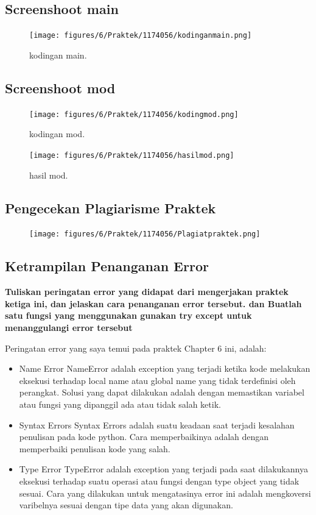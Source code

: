 \subsection{Screenshoot main}
\begin{figure}[H]
	\texttt{[image: figures/6/Praktek/1174056/kodinganmain.png]}
	\caption{kodingan main.}
	\centering
\end{figure}

\subsection{Screenshoot mod}
\begin{figure}[H]
	\texttt{[image: figures/6/Praktek/1174056/kodingmod.png]}
	\caption{kodingan mod.}
	\centering
\end{figure}

\begin{figure}[H]
	\texttt{[image: figures/6/Praktek/1174056/hasilmod.png]}
	\caption{hasil mod.}
	\centering
\end{figure}

\subsection{Pengecekan Plagiarisme Praktek}
\begin{figure}[H]
	\texttt{[image: figures/6/Praktek/1174056/Plagiatpraktek.png]}
	\centering
\end{figure}

\subsection{Ketrampilan Penanganan Error}
\textbf{Tuliskan peringatan error yang didapat dari mengerjakan praktek ketiga ini, dan jelaskan cara penanganan error tersebut. dan Buatlah satu fungsi yang menggunakan gunakan try except untuk menanggulangi error tersebut}

Peringatan error yang saya temui pada praktek Chapter 6 ini, adalah:
\begin{itemize}
	\item Name Error
	NameError adalah exception yang terjadi ketika kode melakukan eksekusi terhadap local name atau global name yang tidak terdefinisi oleh perangkat. Solusi yang dapat dilakukan adalah dengan memastikan variabel atau fungsi yang dipanggil ada atau tidak salah ketik.
	
	\item Syntax Errors
	Syntax Errors adalah suatu keadaan saat  terjadi kesalahan penulisan pada kode python. Cara memperbaikinya adalah dengan memperbaiki penulisan kode yang salah.
	
	\item Type Error
	TypeError adalah exception yang terjadi pada saat dilakukannya eksekusi terhadap suatu operasi atau fungsi dengan type object yang tidak sesuai. Cara yang dilakukan untuk mengatasinya error ini adalah mengkoversi varibelnya sesuai dengan tipe data yang akan digunakan.
\end{itemize}

